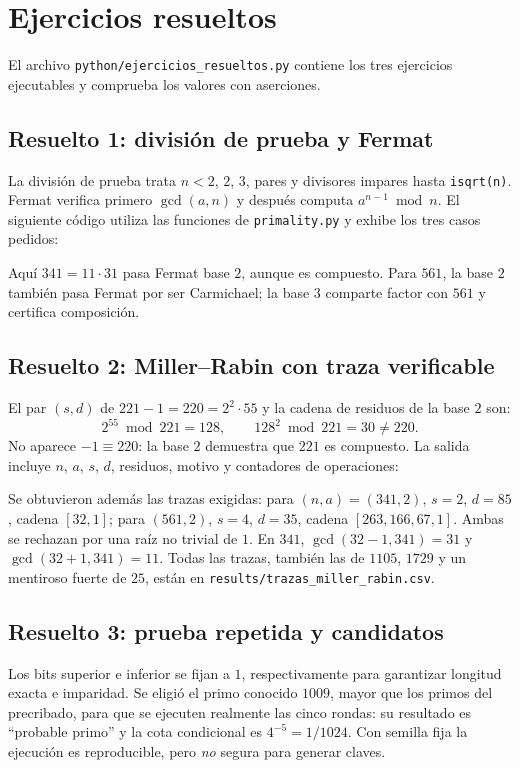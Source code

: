 \section{Ejercicios resueltos}
El archivo \texttt{python/ejercicios\_resueltos.py} contiene los tres ejercicios ejecutables y comprueba los valores con aserciones.

\subsection{Resuelto 1: división de prueba y Fermat}
La división de prueba trata $n<2$, $2$, $3$, pares y divisores impares hasta \texttt{isqrt(n)}. Fermat verifica primero $\gcd(a,n)$ y después computa $a^{n-1}\bmod n$. El siguiente código utiliza las funciones de \texttt{primality.py} y exhibe los tres casos pedidos:

Aquí $341=11\cdot31$ pasa Fermat base $2$, aunque es compuesto. Para $561$, la base $2$ también pasa Fermat por ser Carmichael; la base $3$ comparte factor con $561$ y certifica composición.

\subsection{Resuelto 2: Miller--Rabin con traza verificable}
El par $(s,d)$ de $221-1=220=2^2\cdot55$ y la cadena de residuos de la base $2$ son:
\begin{equation}
2^{55}\bmod221=128,\qquad128^2\bmod221=30\neq220.
\end{equation}
No aparece $-1\equiv220$: la base $2$ demuestra que $221$ es compuesto. La salida incluye $n$, $a$, $s$, $d$, residuos, motivo y contadores de operaciones:

Se obtuvieron además las trazas exigidas: para $(n,a)=(341,2)$, $s=2$, $d=85$, cadena $[32,1]$; para $(561,2)$, $s=4$, $d=35$, cadena $[263,166,67,1]$. Ambas se rechazan por una raíz no trivial de $1$. En $341$, $\gcd(32-1,341)=31$ y $\gcd(32+1,341)=11$. Todas las trazas, también las de $1105$, $1729$ y un mentiroso fuerte de $25$, están en \texttt{results/trazas\_miller\_rabin.csv}.

\subsection{Resuelto 3: prueba repetida y candidatos}

Los bits superior e inferior se fijan a $1$, respectivamente para garantizar longitud exacta e imparidad. Se eligió el primo conocido $1009$, mayor que los primos del precribado, para que se ejecuten realmente las cinco rondas: su resultado es ``probable primo'' y la cota condicional es $4^{-5}=1/1024$. Con semilla fija la ejecución es reproducible, pero \emph{no} segura para generar claves.
